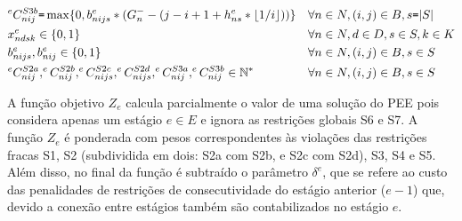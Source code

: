 \documentclass[cic,tc, twoside]{iiufrgs}
\begin{document}
\begin{samepage}
\begin{align}
& ^eC^{S3b}_{nij} \texttt{=}  \max\{0, b^e_{nijs} * (G^-_{n} - (j - i +1  + h^e_{ns}*\lfloor 1/i \rfloor))\} && \forall n \in N, (i,j) \in B, s \texttt{=} |S| \label{eS3b} \\
& x^e_{ndsk} \in \{0,1\}  &&  \forall n \in N, d \in D, s \in S, k \in K  \notag  \\
& b^e_{nijs},  b^e_{nij} \in \{0,1\}  &&  \forall n \in N, (i,j) \in B, s \in S \notag \\
& ^eC^{S2a}_{nij}, ^eC^{S2b}_{nij}, ^eC^{S2c}_{nijs}, ^eC^{S2d}_{nijs}, ^eC^{S3a}_{nij}, ^eC^{S3b}_{nij} \in \mathbb{N^*} && \forall n \in N, (i,j) \in B, s \in S \notag 
\end{align}
\end{samepage}

A função objetivo $Z_e$ calcula parcialmente o valor de uma solução do PEE pois considera apenas um estágio $e \in E$ e ignora as restrições globais S6 e S7. A função $Z_e$ é ponderada com pesos correspondentes às violações das restrições fracas S1, S2 (subdividida em dois: S2a com S2b, e S2c com S2d), S3, S4 e S5. Além disso, no final da função é subtraído o parâmetro $\delta^e$, que se refere ao custo das penalidades de restrições de consecutividade do estágio anterior ($e-1$) que, devido a conexão entre estágios também são contabilizados no estágio $e$.
\end{document}
